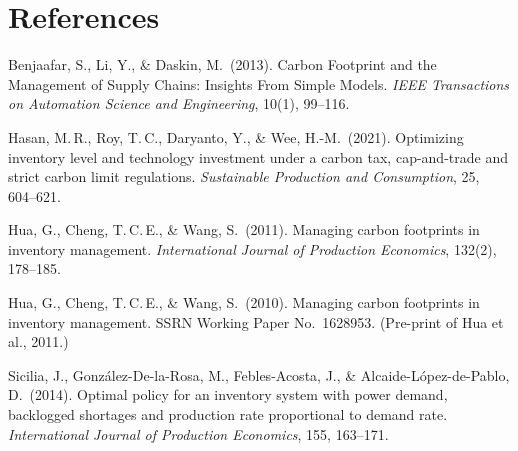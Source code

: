 \documentclass[11pt,a4paper]{article}
\begin{document}
\section*{References}

\begin{enumerate}[leftmargin=2em,itemsep=0.35em,label={[\arabic*]}]
\item Benjaafar, S., Li, Y., \& Daskin, M.\ (2013). Carbon Footprint and the Management of Supply Chains: Insights From Simple Models. \emph{IEEE Transactions on Automation Science and Engineering}, 10(1), 99--116.

\item Hasan, M.\,R., Roy, T.\,C., Daryanto, Y., \& Wee, H.-M.\ (2021). Optimizing inventory level and technology investment under a carbon tax, cap-and-trade and strict carbon limit regulations. \emph{Sustainable Production and Consumption}, 25, 604--621.

\item Hua, G., Cheng, T.\,C.\,E., \& Wang, S.\ (2011). Managing carbon footprints in inventory management. \emph{International Journal of Production Economics}, 132(2), 178--185.

\item Hua, G., Cheng, T.\,C.\,E., \& Wang, S.\ (2010). Managing carbon footprints in inventory management. SSRN Working Paper No.\ 1628953. (Pre-print of Hua et al., 2011.)

\item Sicilia, J., Gonz\'alez-De-la-Rosa, M., Febles-Acosta, J., \& Alcaide-L\'opez-de-Pablo, D.\ (2014). Optimal policy for an inventory system with power demand, backlogged shortages and production rate proportional to demand rate. \emph{International Journal of Production Economics}, 155, 163--171.
\end{enumerate}
\end{document}
